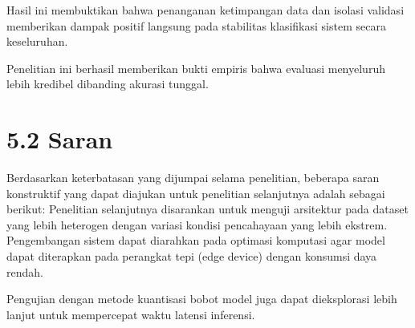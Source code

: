\documentclass[12pt,a4paper,oneside]{report}
\begin{document}
Hasil ini membuktikan bahwa penanganan ketimpangan data dan isolasi validasi memberikan dampak positif langsung pada stabilitas klasifikasi sistem secara keseluruhan.

Penelitian ini berhasil memberikan bukti empiris bahwa evaluasi menyeluruh lebih kredibel dibanding akurasi tunggal.

\section{5.2 Saran}
Berdasarkan keterbatasan yang dijumpai selama penelitian, beberapa saran konstruktif yang dapat diajukan untuk penelitian selanjutnya adalah sebagai berikut:
Penelitian selanjutnya disarankan untuk menguji arsitektur pada dataset yang lebih heterogen dengan variasi kondisi pencahayaan yang lebih ekstrem.
Pengembangan sistem dapat diarahkan pada optimasi komputasi agar model dapat diterapkan pada perangkat tepi (edge device) dengan konsumsi daya rendah.

Pengujian dengan metode kuantisasi bobot model juga dapat dieksplorasi lebih lanjut untuk mempercepat waktu latensi inferensi.

\printbibliography[title={DAFTAR PUSTAKA}]
\end{document}
